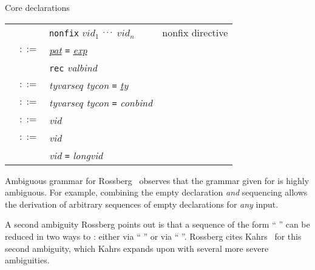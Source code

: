 \begin{grammar}{Core declarations}
\begin{longtable}{rcll}
&\alt&\texttt{nonfix} \optional{\textit{d}} $vid_{1}$ $\mathinner{{}^{\textstyle .\,.\,.}}$ $vid_{n}$
&nonfix directive\\
\label{grammar:valbind}\nonterminal{valbind} & $::=$ & \hyperref[grammar:pat]{\textit{pat}}
\texttt{=} \hyperref[grammar:exp]{\textit{exp}} \optional{\texttt{and} \textit{valbind}}\\
&\alt&\texttt{rec} \textit{valbind}\\
\label{grammar:typbind}\nonterminal{typbind} & $::=$ &
\textit{tyvarseq tycon} \texttt{=} \hyperref[grammar:ty]{\textit{ty}} \optional{\texttt{and} \textit{typbind}}\\
\label{grammar:datbind}\nonterminal{datbind} & $::=$ &
\textit{tyvarseq tycon} \texttt{=} \textit{conbind} \optional{\texttt{and} \textit{datbind}}\\
\label{grammar:conbind}\nonterminal{conbind} & $::=$ &
\optional{\texttt{op}}\textit{vid} \optional{\texttt{of} \hyperref[grammar:ty]{\textit{ty}}} \optional{\texttt{\char`\|} \textit{datbind}}\\
\label{grammar:exbind}\nonterminal{exbind} & $::=$ &
\optional{\texttt{op}}\textit{vid} \optional{\texttt{of} \hyperref[grammar:ty]{\textit{ty}}} \optional{\texttt{and} \textit{exbind}}\\ 
&\alt&\optional{\texttt{op}}\textit{vid} \texttt{=} \optional{\texttt{op}} \textit{longvid} \optional{\texttt{and} \textit{exbind}}\\ 
\end{longtable}
\end{grammar}


\begin{remark}{Ambiguous grammar for }
Rossberg~\cite{rossbert2018defects} observes that the grammar given for
 is highly ambiguous. For example, combining the empty
declaration \emph{and} sequencing allows the derivation of arbitrary
sequences of empty declarations for \emph{any} input.

A second ambiguity Rossberg points out is that a sequence of the form
``  ''
can be reduced in two ways to : either via
`` '' or via `` ''.
Rossberg cites Kahrs~\cite[\S8.3]{kahrs1993mistakes} for this second
ambiguity, which Kahrs expands upon with several more severe ambiguities.
\end{remark}

